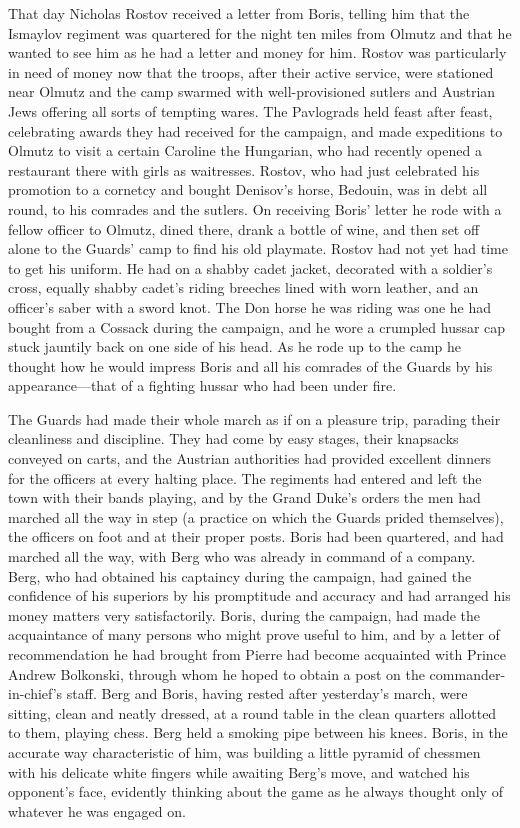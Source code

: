 That day Nicholas Rostov received a letter from Boris, telling
him that the Ismaylov regiment was quartered for the night ten
miles from Olmutz and that he wanted to see him as he had a
letter and money for him.  Rostov was particularly in need of
money now that the troops, after their active service, were
stationed near Olmutz and the camp swarmed with well-provisioned
sutlers and Austrian Jews offering all sorts of tempting
wares. The Pavlograds held feast after feast, celebrating awards
they had received for the campaign, and made expeditions to
Olmutz to visit a certain Caroline the Hungarian, who had
recently opened a restaurant there with girls as
waitresses. Rostov, who had just celebrated his promotion to a
cornetcy and bought Denisov's horse, Bedouin, was in debt all
round, to his comrades and the sutlers. On receiving Boris'
letter he rode with a fellow officer to Olmutz, dined there,
drank a bottle of wine, and then set off alone to the Guards'
camp to find his old playmate. Rostov had not yet had time to get
his uniform. He had on a shabby cadet jacket, decorated with a
soldier's cross, equally shabby cadet's riding breeches lined
with worn leather, and an officer's saber with a sword knot. The
Don horse he was riding was one he had bought from a Cossack
during the campaign, and he wore a crumpled hussar cap stuck
jauntily back on one side of his head. As he rode up to the camp
he thought how he would impress Boris and all his comrades of the
Guards by his appearance---that of a fighting hussar who had been
under fire.

The Guards had made their whole march as if on a pleasure trip,
parading their cleanliness and discipline. They had come by easy
stages, their knapsacks conveyed on carts, and the Austrian
authorities had provided excellent dinners for the officers at
every halting place. The regiments had entered and left the town
with their bands playing, and by the Grand Duke's orders the men
had marched all the way in step (a practice on which the Guards
prided themselves), the officers on foot and at their proper
posts. Boris had been quartered, and had marched all the way,
with Berg who was already in command of a company. Berg, who had
obtained his captaincy during the campaign, had gained the
confidence of his superiors by his promptitude and accuracy and
had arranged his money matters very satisfactorily. Boris, during
the campaign, had made the acquaintance of many persons who might
prove useful to him, and by a letter of recommendation he had
brought from Pierre had become acquainted with Prince Andrew
Bolkonski, through whom he hoped to obtain a post on the
commander-in-chief's staff. Berg and Boris, having rested after
yesterday's march, were sitting, clean and neatly dressed, at a
round table in the clean quarters allotted to them, playing
chess. Berg held a smoking pipe between his knees. Boris, in the
accurate way characteristic of him, was building a little pyramid
of chessmen with his delicate white fingers while awaiting Berg's
move, and watched his opponent's face, evidently thinking about
the game as he always thought only of whatever he was engaged on.

